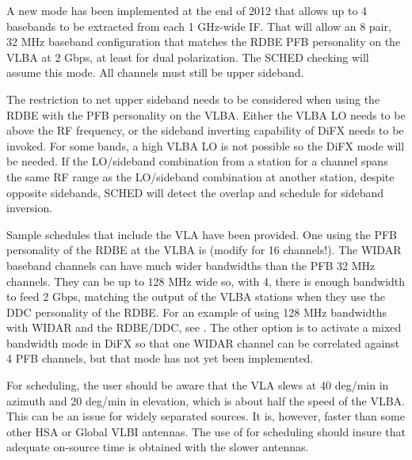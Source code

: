 \documentclass{report}
\begin{document}
A new mode has been implemented at the end of 2012 that allows up to 4
basebands to be extracted from each 1 GHz-wide IF.  That will allow an
8 pair, 32 MHz baseband configuration that matches the RDBE PFB
personality on the VLBA at 2 Gbps, at least for dual polarization.
The SCHED checking will assume this mode.  All channels must still be
upper sideband.

The restriction to net upper sideband needs to be considered when
using the RDBE with the PFB personality on the VLBA.  Either the VLBA
LO needs to be above the RF frequency, or the sideband inverting
capability of DiFX needs to be invoked.  For some bands, a high VLBA
LO is not possible so the DiFX mode will be needed.  If the LO/sideband
combination from a station for a channel spans the same RF range as
the LO/sideband combination at another station, despite opposite
sidebands, SCHED will detect the overlap and schedule for sideband
inversion.

Sample schedules that include the VLA have been provided.  One using
the PFB personality of the RDBE at the VLBA is  (modify for 16 channels!).  The WIDAR
baseband channels can have much wider bandwidths than the PFB 32 MHz
channels.  They can be up to 128 MHz wide so, with 4, there is enough
bandwidth to feed 2 Gbps, matching the output of the VLBA stations
when they use the DDC personality of the RDBE.  For an example of
using 128 MHz bandwidths with WIDAR and the RDBE/DDC, see
.  The other
option is to activate a mixed bandwidth mode in DiFX so that one WIDAR
channel can be correlated against 4 PFB channels, but that mode has
not yet been implemented.

For scheduling, the user should be aware that the VLA slews at 40
deg/min in azimuth and 20 deg/min in elevation, which is about half
the speed of the VLBA.  This can be an issue for widely separated
sources.  It is, however, faster than some other HSA or Global VLBI
antennas.  The use of  for scheduling
should insure that adequate on-source time is obtained with the
slower antennas.
\end{document}
